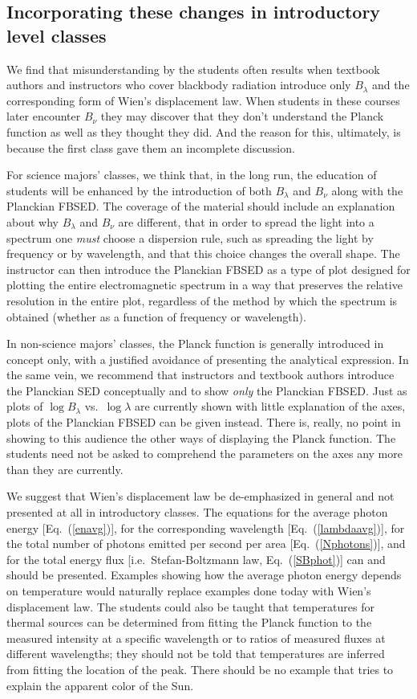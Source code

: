\documentclass[12pt,aps,prb,preprint]{revtex4}   %
\begin{document}
\subsection{Incorporating these changes in introductory level classes}

We find that misunderstanding by the students often results when textbook authors and instructors who cover blackbody radiation introduce only $B_\lambda$ and the corresponding form of Wien's displacement law.  When students in these courses later encounter $B_\nu$ they may discover that they don't understand the Planck function as well as they thought they did.  And the reason for this, ultimately, is because the first class gave them an incomplete discussion.  

For science majors' classes, we think that, in the long run, the education of students will be enhanced by the introduction of both $B_\lambda$ and $B_\nu$ along with the Planckian FBSED.  The coverage of the material should include an explanation about why $B_\lambda$ and $B_\nu$ are different, that in order to spread the light into a spectrum one {\it must} choose a dispersion rule, such as spreading the light by frequency or by wavelength, and that this choice changes the overall shape.  The instructor can then introduce the Planckian FBSED as a type of plot designed for plotting the entire electromagnetic spectrum in a way that preserves the relative resolution in the entire plot, regardless of the method by which the spectrum is obtained (whether as a function of frequency or wavelength).

In non-science majors' classes, the Planck function is generally introduced in concept only, with a justified avoidance of presenting the analytical expression.  In the same vein, we recommend that instructors and textbook authors introduce the Planckian SED conceptually and to show {\it only} the Planckian FBSED.  Just as plots of 
$\log B_\lambda$ vs.\ $\log \lambda$ are currently shown with little explanation of the axes, plots of the Planckian FBSED can be given instead.  There is, really, no point in showing to this audience the other ways of displaying the Planck function.  The students need not be asked to comprehend the parameters on the axes any more than they are currently.

We suggest that Wien's displacement law be de-emphasized in general and not presented at all in introductory classes.  The equations for the average photon energy [Eq.~(\ref{enavg})], for the corresponding wavelength [Eq.~(\ref{lambdaavg})], for the total number of photons emitted per second per area [Eq.~(\ref{Nphotons})], and for the total energy flux [i.e.\ Stefan-Boltzmann law, Eq.~(\ref{SBphot})] can and should be presented.  Examples showing how the average photon energy depends on temperature would naturally replace examples done today with Wien's displacement law.  The students could also be taught that temperatures for thermal sources can be determined from fitting the Planck function to the measured intensity at a specific wavelength or to ratios of measured fluxes at different wavelengths; they should not be told that temperatures are inferred from fitting the location of the peak.  There should be no example that tries to explain the apparent color of the Sun.
\end{document}
